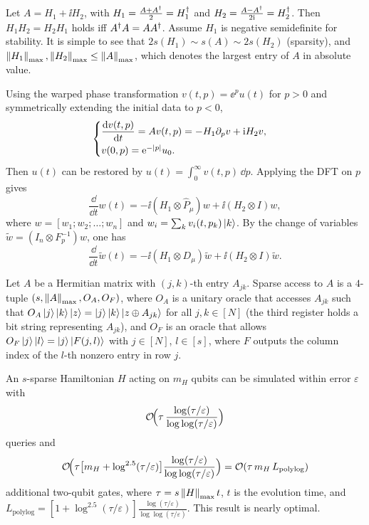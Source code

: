 Let $A = H_1 + \ii H_2$, with
$H_1 = \tfrac{A + A^{\dagger}}{2} = H_1^{\dagger}$ and $H_2 = \tfrac{A - A^{\dagger}}{2\mathrm{i}} = H_2^{\dagger}$.
Then $H_1 H_2 = H_2 H_1$ holds iff $A^{\dagger} A = A A^{\dagger}$. Assume $H_1$ is negative
semidefinite for stability. It is simple to see that
$2s(H_1) \sim s(A) \sim 2s(H_2)$ (sparsity), and
$\left\lVert H_1 \right\rVert_{\max}, \left\lVert H_2 \right\rVert_{\max} \le \left\lVert A \right\rVert_{\max}$, which denotes the
largest entry of $A$ in absolute value.

Using the warped phase transformation $v(t, p) = \ee^{p} u(t)$ for $p > 0$ and
symmetrically extending the initial data to $p < 0$,
\begin{equation}
  \begin{cases}
    \dfrac{\mathrm{d} v(t, p)}{\mathrm{d} t} = A v(t, p) = -H_1 \partial_p v + \mathrm{i} H_2 v, \\[0.5em]
    v(0, p) = \mathrm{e}^{-\left\lvert p \right\rvert} u_0.
  \end{cases}
\end{equation}
Then $u(t)$ can be restored by $u(t) = \int_0^\infty v(t, p)\,\dd p$. Applying the
DFT on $p$ gives
\begin{equation}
  \frac{\dd}{\dd t} w(t) = -\ii(H_1 \otimes \hat{P}_\mu) w + \ii(H_2 \otimes I) w,
\end{equation}
where $w = [w_1; w_2; \dots; w_n]$ and $w_i = \sum_k v_i(t, p_k)\ket{k}$. By the
change of variables $\tilde{w} = (I_n \otimes F_p^{-1}) w$, one has
\begin{equation}
  \frac{\dd}{\dd t} \tilde{w}(t) = -\ii(H_1 \otimes D_\mu)\tilde{w} + \ii(H_2 \otimes I)\tilde{w}.
\end{equation}

\begin{definition}
Let $A$ be a Hermitian matrix with $(j,k)$-th entry $A_{jk}$. Sparse access to $A$
is a $4$-tuple $(s, \left\lVert A \right\rVert_{\max}, O_A, O_F)$, where $O_A$ is a unitary oracle
that accesses $A_{jk}$ such that
$O_A\ket{j}\ket{k}\ket{z} = \ket{j}\ket{k}\ket{z \oplus A_{jk}}$ for all
$j, k \in [N]$ (the third register holds a bit string representing $A_{jk}$), and
$O_F$ is an oracle that allows $O_F\ket{j}\ket{l} = \ket{j}\ket{F(j, l)}$ with
$j \in [N]$, $l \in [s]$, where $F$ outputs the column index of the $l$-th nonzero
entry in row $j$.
\end{definition}

\begin{lemma}
An $s$-sparse Hamiltonian $H$ acting on $m_H$ qubits can be simulated within
error $\varepsilon$ with
\begin{equation}
  \mathcal{O}\!\Bigl(\tau\, \frac{\log(\tau/\varepsilon)}{\log\log(\tau/\varepsilon)}\Bigr)
\end{equation}
queries and
\begin{equation}
  \mathcal{O}\!\Bigl(\tau\bigl[m_H + \log^{2.5}(\tau/\varepsilon)\bigr]\frac{\log(\tau/\varepsilon)}{\log\log(\tau/\varepsilon)}\Bigr)
  = \mathcal{O}(\tau\, m_H\, L_{\mathrm{polylog}})
\end{equation}
additional two-qubit gates, where $\tau = s\left\lVert H \right\rVert_{\max} t$, $t$ is the
evolution time, and
$L_{\mathrm{polylog}} = [1 + \log^{2.5}(\tau/\varepsilon)]\frac{\log(\tau/\varepsilon)}{\log\log(\tau/\varepsilon)}$.
This result is nearly optimal.
\end{lemma}

